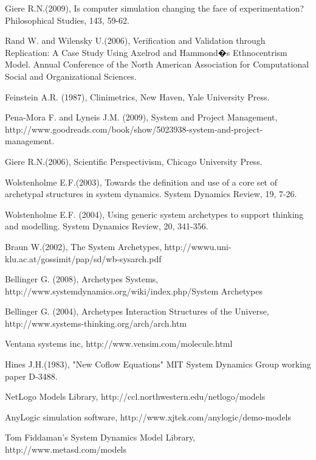 \documentclass[11pt]{article}
\begin{document}
\begin{thebibliography}{}

 Giere R.N.(2009), Is computer simulation changing the face of experimentation? Philosophical Studies, 143, 59-62.

 Rand W. and Wilensky U.(2006), Verification and Validation through Replication: A Case Study Using Axelrod and Hammond�s Ethnocentrism Model. Annual Conference of the North American Association for Computational Social and Organizational Sciences.

 Feinstein A.R. (1987), Clinimetrics, New Haven, Yale University Press.  

 Pena-Mora F. and Lyneis J.M. (2009), System and Project Management, http://www.goodreads.com/book/show/5023938-system-and-project-management.

 Giere R.N.(2006), Scientific Perspectivism, Chicago University Press. 

 Wolstenholme E.F.(2003), Towards the definition and use of a core set of archetypal structures in system dynamics. System Dynamics Review, 19, 7-26. 

 Wolstenholme E.F. (2004), Using generic system archetypes to support thinking and modelling. System Dynamics Review, 20, 341-356.

Braun W.(2002), The System Archetypes,  http://wwwu.uni-klu.ac.at/gossimit/pap/sd/wb-sysarch.pdf

 Bellinger G. (2008), Archetypes Systems, http://www.systemdynamics.org/wiki/index.php/System
Archetypes

 Bellinger G. (2004), Archetypes Interaction Structures of the Universe,  http://www.systems-thinking.org/arch/arch.htm

Ventana systems inc, http://www.vensim.com/molecule.html 

Hines J.H.(1983), "New Coflow Equations" MIT System Dynamics Group working paper D-3488.

NetLogo Models Library, http://ccl.northwestern.edu/netlogo/models

AnyLogic simulation software, http://www.xjtek.com/anylogic/demo-models

Tom Fiddaman's System Dynamics Model Library, http://www.metasd.com/models


\end{thebibliography}
\end{document}
